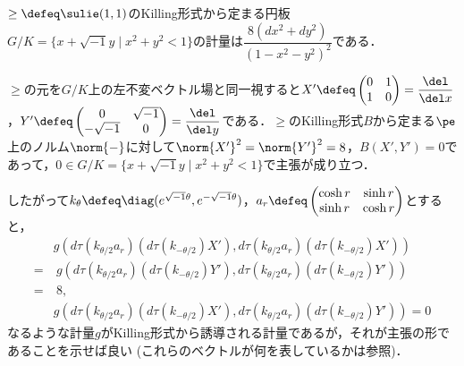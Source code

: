 
\begin{lem}\label{lem:riem-metric-su11}
  $\ge\defeq \sulie(1,1)$のKilling形式から定まる{\Poincare}円板$G/K =\{x+\sqrt{-1}y\mid x^2 + y^2 < 1 \} $の計量は$ \dfrac{8(dx^2 + dy^2)}{(1 - x^2 - y^2)^2} $である．
\end{lem}

\begin{pfwn}{}
  
$\ge$の元を$G/K$上の左不変ベクトル場と同一視すると$X' \defeq 
\begin{pmatrix}
  0 & 1 \\ 1 & 0
\end{pmatrix} = \dfrac{\del}{\del x}
$，$Y' \defeq 
\begin{pmatrix}
  0 & \sqrt{-1} \\ -\sqrt{-1} & 0
\end{pmatrix} = \dfrac{\del}{\del y}
$である．$\ge$のKilling形式$B$から定まる$\pe$上のノルム$\norm{-} $に対して$\norm{X'}^2 = \norm{Y'}^2 = 8 $，$B(X', Y' ) = 0$であって，$0\in G/K =\{x+\sqrt{-1}y\mid x^2 + y^2 < 1 \}  $で主張が成り立つ．

したがって$k_{\theta} \defeq \diag(e^{\sqrt{-1}\theta},e^{-\sqrt{-1}\theta}) $，$a_r\defeq
\begin{pmatrix}
  \cosh r & \sinh r \\  \sinh r & \cosh r
\end{pmatrix}
$とすると，
\begin{align*}
  &g(d\tau(k_{\theta/2}a_r)(d\tau(k_{-\theta/2})X'), d\tau(k_{\theta/2}a_r)(d\tau(k_{-\theta/2})X')) \\
  =&\ g (d\tau(k_{\theta/2}a_r)(d\tau(k_{-\theta/2})Y'), d\tau(k_{\theta/2}a_r)(d\tau(k_{-\theta/2})Y')) \\
  =&\ 8, \\
  &g(d\tau(k_{\theta/2}a_r)(d\tau(k_{-\theta/2})X'), d\tau(k_{\theta/2}a_r)(d\tau(k_{-\theta/2})Y'))  = 0
\end{align*}
なるような計量$g $がKilling形式から誘導される計量であるが，それが主張の形であることを示せば良い (これらのベクトルが何を表しているかは参照)．


\end{pfwn}
